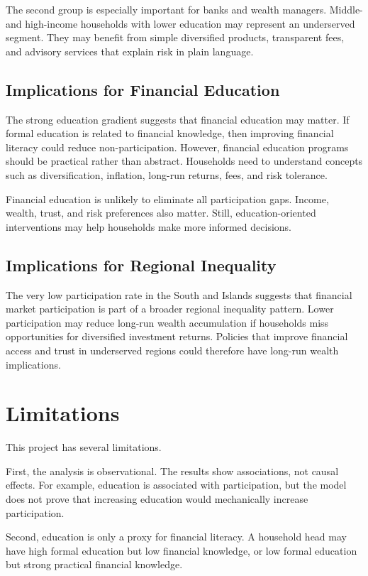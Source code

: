 \documentclass[12pt]{article}
\begin{document}
The second group is especially important for banks and wealth managers. Middle- and high-income households with lower education may represent an underserved segment. They may benefit from simple diversified products, transparent fees, and advisory services that explain risk in plain language.

\subsection{Implications for Financial Education}

The strong education gradient suggests that financial education may matter. If formal education is related to financial knowledge, then improving financial literacy could reduce non-participation. However, financial education programs should be practical rather than abstract. Households need to understand concepts such as diversification, inflation, long-run returns, fees, and risk tolerance.

Financial education is unlikely to eliminate all participation gaps. Income, wealth, trust, and risk preferences also matter. Still, education-oriented interventions may help households make more informed decisions.

\subsection{Implications for Regional Inequality}

The very low participation rate in the South and Islands suggests that financial market participation is part of a broader regional inequality pattern. Lower participation may reduce long-run wealth accumulation if households miss opportunities for diversified investment returns. Policies that improve financial access and trust in underserved regions could therefore have long-run wealth implications.

\section{Limitations}

This project has several limitations.

First, the analysis is observational. The results show associations, not causal effects. For example, education is associated with participation, but the model does not prove that increasing education would mechanically increase participation.

Second, education is only a proxy for financial literacy. A household head may have high formal education but low financial knowledge, or low formal education but strong practical financial knowledge.
\end{document}
